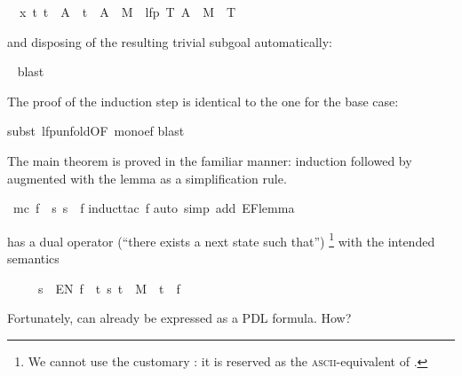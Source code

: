 \begin{isabellebody}
\begin{isamarkuptxt}
\begin{isabelle}
\ {}{\isachardot}\ {\isasymAnd}x\ t{\isachardot}\ t\ {\isasymin}\ A\ {\isasymLongrightarrow}\ t\ {\isasymin}\ A\ {\isasymunion}\ M{\isasyminverse}\ {\isacharbackquote}{\isacharbackquote}\ lfp\ {\isacharparenleft}{\isasymlambda}T{\isachardot}\ A\ {\isasymunion}\ M{\isasyminverse}\ {\isacharbackquote}{\isacharbackquote}\ T{\isacharparenright}%
\end{isabelle}
and disposing of the resulting trivial subgoal automatically:%
\end{isamarkuptxt}%
\isamarkuptrue%
\ \isamarkupfalse%
{\isacharparenleft}blast{\isacharparenright}%
\begin{isamarkuptxt}%
\noindent
The proof of the induction step is identical to the one for the base case:%
\end{isamarkuptxt}%
\isamarkuptrue%
\isamarkupfalse%
{\isacharparenleft}subst\ lfp{\isacharunderscore}unfold{\isacharbrackleft}OF\ mono{\isacharunderscore}ef{\isacharbrackright}{\isacharparenright}\isanewline
{}\isamarkupfalse%
{\isacharparenleft}blast{\isacharparenright}\isanewline
{}\isamarkupfalse%
%
\endisatagproof
{\isafoldproof}%
%
\isadelimproof
%
\endisadelimproof
%
\begin{isamarkuptext}%
The main theorem is proved in the familiar manner: induction followed by
 augmented with the lemma as a simplification rule.%
\end{isamarkuptext}%
\isamarkuptrue%
\isamarkupfalse%
\ {\isachardoublequoteopen}mc\ f\ {\isacharequal}\ {\isacharbraceleft}s{\isachardot}\ s\ {\isasymTurnstile}\ f{\isacharbraceright}{\isachardoublequoteclose}\isanewline
%
\isadelimproof
%
\endisadelimproof
%
\isatagproof
{}\isamarkupfalse%
{\isacharparenleft}induct{\isacharunderscore}tac\ f{\isacharparenright}\isanewline
{}\isamarkupfalse%
{\isacharparenleft}auto\ simp\ add{\isacharcolon}\ EF{\isacharunderscore}lemma{\isacharparenright}\isanewline
{}\isamarkupfalse%
%
\endisatagproof
{\isafoldproof}%
%
\isadelimproof
%
\endisadelimproof
%
\begin{isamarkuptext}%
\begin{exercise}
 has a dual operator  
(``there exists a next state such that'')%
\footnote{We cannot use the customary : it is reserved
as the \textsc{ascii}-equivalent of \isa{{\isasymexists}}.}
with the intended semantics
\begin{isabelle}%
\ \ \ \ \ s\ {\isasymTurnstile}\ EN\ f\ {\isacharequal}\ {\isacharparenleft}{\isasymexists}t{\isachardot}\ {\isacharparenleft}s{\isacharcomma}\ t{\isacharparenright}\ {\isasymin}\ M\ {\isasymand}\ t\ {\isasymTurnstile}\ f{\isacharparenright}%
\end{isabelle}
Fortunately,  can already be expressed as a PDL formula. How?


\end{exercise}
\end{isamarkuptext}
\end{isabellebody}
